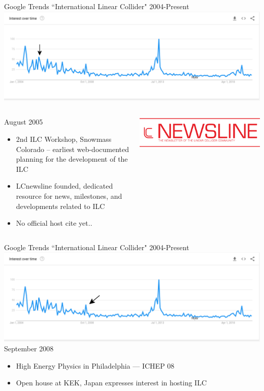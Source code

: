 \documentclass[10pt]{beamer}
\begin{document}
\begin{frame}
Google Trends ``International Linear Collider" 2004-Present
\includegraphics[scale=0.25]{timeline2.png}\\
\begin{columns}
\begin{column}{0.5\textwidth}

August 2005 
\begin{itemize}
\scriptsize
\item 2nd ILC Workshop, Snowmass Colorado -- earliest web-documented planning for the development of the ILC 

\item LCnewsline founded, dedicated resource for news, milestones, and developments related to ILC
\item No official host cite yet..
\end{itemize}
\end{column}
\begin{column}{0.5\textwidth}
\includegraphics[scale=0.2]{lcnews.png}\\

\end{column}
\end{columns}
\end{frame}
\begin{frame}
Google Trends ``International Linear Collider" 2004-Present
\includegraphics[scale=0.25]{timeline3.png}\\
September 2008 
\begin{itemize}
\item High Energy Physics in Philadelphia — ICHEP 08 
\item Open house at KEK, Japan expresses interest in hosting ILC
\end{itemize} 
\end{frame}
\end{document}
